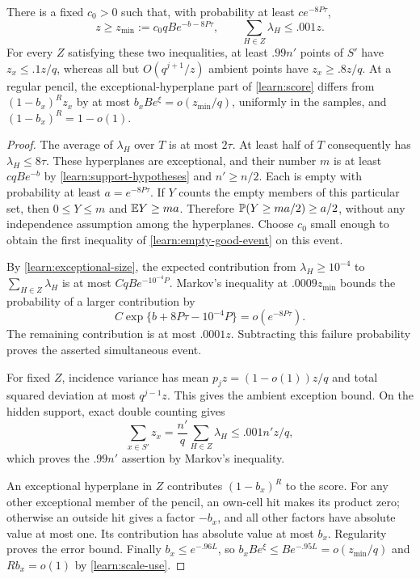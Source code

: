 \begin{lemma}\label{learn:empty-exceptional}
There is a fixed $c_0>0$ such that, with probability at least
$c e^{-8P\tau}$,
\begin{equation}\label{learn:empty-good-event}
 z\ge z_{\min}:=c_0qB e^{-b-8P\tau},\qquad
 \sum_{H\in Z}\lambda_H\le .001z.
\end{equation}
For every $Z$ satisfying these two inequalities, at least $.99n'$
points of $S'$ have $z_x\le .1z/q$, whereas all but
$O(q^{j+1}/z)$ ambient points have $z_x\ge .8z/q$.
At a regular pencil, the exceptional-hyperplane part of
\eqref{learn:score} differs from $(1-b_x)^Rz_x$ by at most
$b_xBe^\xi=o(z_{\min}/q)$, uniformly in the samples, and
$(1-b_x)^R=1-o(1)$.
\end{lemma}

\begin{proof}
The average of $\lambda_H$ over $T$ is at most $2\tau$.
At least half of $T$ consequently has $\lambda_H\le8\tau$.
These hyperplanes are exceptional, and their number $m$ is at least
$c qB e^{-b}$ by \eqref{learn:support-hypotheses} and $n'\ge n/2$.
Each is empty with probability at least $a=e^{-8P\tau}$.
If $Y$ counts the empty members of this particular set, then
$0\le Y\le m$ and $\mathbb E Y\ge ma$. Therefore
$\mathbb P(Y\ge ma/2)\ge a/2$, without any independence assumption among
the hyperplanes. Choose $c_0$ small enough to obtain the first inequality
of \eqref{learn:empty-good-event} on this event.

By \eqref{learn:exceptional-size}, the expected contribution from
$\lambda_H\ge10^{-4}$ to $\sum_{H\in Z}\lambda_H$ is at most
$CqB e^{-10^{-4}P}$. Markov's inequality at $.0009z_{\min}$ bounds
the probability of a larger contribution by
\[
 C\exp\{b+8P\tau-10^{-4}P\}=o(e^{-8P\tau}).
\]
The remaining contribution is at most $.0001z$. Subtracting this
failure probability proves the asserted simultaneous event.

For fixed $Z$, incidence variance has mean $p_jz=(1-o(1))z/q$ and
total squared deviation at most $q^{j-1}z$. This gives the ambient
exception bound. On the hidden support, exact double counting gives
\[
 \sum_{x\in S'}z_x=\frac{n'}q\sum_{H\in Z}\lambda_H
 \le .001n'z/q,
\]
which proves the $.99n'$ assertion by Markov's inequality.

An exceptional hyperplane in $Z$ contributes $(1-b_x)^R$ to the score.
For any other exceptional member of the pencil, an own-cell hit makes
its product zero; otherwise an outside hit gives a factor $-b_x$,
and all other factors have absolute value at most one. Its contribution
has absolute value at most $b_x$. Regularity proves the error bound.
Finally $b_x\le e^{-.96L}$, so
$b_xBe^\xi\le Be^{-.95L}=o(z_{\min}/q)$ and $Rb_x=o(1)$ by
\eqref{learn:scale-use}.
\end{proof}


